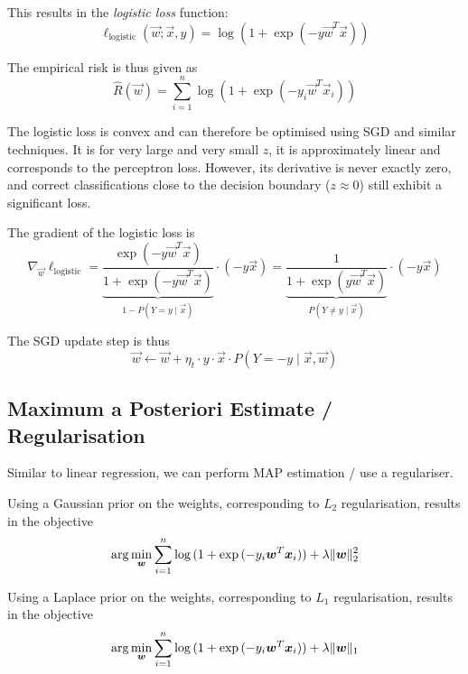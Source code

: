 This results in the \emph{logistic loss} function:
\begin{equation*}
\ell_\text{logistic}(\vec{w}; \vec{x}, y) =
\log{(1 + \exp{(- y \vec{w}^T \vec{x})})}
\end{equation*}

The empirical risk is thus given as
\begin{equation*}
\hat{R}(\vec{w}) = \sum_{i=1}^n{
	\log{(1 + \exp{(-y_i \vec{w}^T \vec{x}_i)})}
}
\end{equation*}

The logistic loss is convex and can
therefore be optimised using SGD and
similar techniques.
It is for very large and very small
$z$, it is approximately linear and
corresponds to the perceptron loss.
However, its derivative is never
exactly zero, and correct classifications
close to the decision boundary
($z \approx 0$) still exhibit
a significant loss.

The gradient of the logistic loss is
\begin{equation*}
\nabla_{\vec{w}} \ell_\text{logistic}
= \underbrace{\frac{\exp{(-y\vec{w}^T \vec{x})}}{1+\exp{(-y \vec{w}^T \vec{x})}}}_{1 - P(Y = y \mid \vec{x})} \cdot (-y \vec{x})
= \underbrace{\frac{1}{1 + \exp{(y \vec{w}^T \vec{x})}}}_{P(Y \neq y \mid \vec{x})} \cdot (-y \vec{x})
\end{equation*}

The SGD update step is thus
\begin{equation*}
\vec{w} \gets \vec{w} + \eta_t \cdot y \cdot \vec{x} \cdot P(Y = -y \mid \vec{x}, \vec{w})
\end{equation*}


\subsection{Maximum a Posteriori Estimate / Regularisation}
Similar to linear regression, we can perform
MAP estimation / use a regulariser.

Using a Gaussian prior on the weights,
corresponding to $L_2$ regularisation,
results in the objective
\begin{equation*}
\arg\min_{\boldsymbol{w}}{
	\sum_{i=1}^n{\log{(1 + \exp{(-y_i \boldsymbol{w}^T \boldsymbol{x}_i)})}}
	+ \lambda \lVert\boldsymbol{w}\rVert_2^2
}
\end{equation*}

Using a Laplace prior on the weights,
corresponding to $L_1$ regularisation,
results in the objective
\begin{equation*}
\arg\min_{\boldsymbol{w}}{
	\sum_{i=1}^n{\log{(1 + \exp{(-y_i \boldsymbol{w}^T \boldsymbol{x}_i)})}}
	+ \lambda \lVert\boldsymbol{w}\rVert_1
}
\end{equation*}

